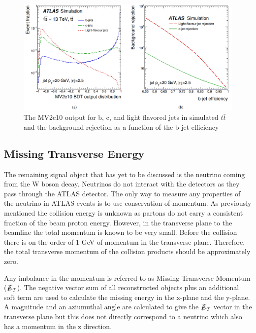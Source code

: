 \begin{figure}[h!]
	\centering
	\includegraphics[width=\columnwidth]{../ThesisImages/Simulation/BTagMV2c10andRejVsEff.png}
	\caption[The MV2c10 output for b, c, and light flavored jets in simulated $t\bar{t}$ and the background rejection as a function of the b-jet efficiency]{The MV2c10 output for b, c, and light flavored jets in simulated $t\bar{t}$ and the background rejection as a function of the b-jet efficiency \cite{BJetMVA}
	}
	\label{fig:BTag}
\end{figure}


\label{sec:bjetReco}

\subsection{Missing Transverse Energy}
The remaining signal object that has yet to be discussed is the neutrino coming from the W boson decay.  Neutrinos do not interact with the detectors as they pass through the ATLAS detector.  The only way to measure any properties of the neutrino in ATLAS events is to use conservation of momentum.  As previously mentioned the collision energy is unknown as partons do not carry a consistent fraction of the beam proton energy.  However, in the transverse plane to the beamline the total momentum is known to be very small.  Before the collision there is on the order of 1 GeV of momentum in the transverse plane.  Therefore, the total transverse momentum of the collision products should be approximately zero.

Any imbalance in the momentum is referred to as Missing Transverse Momentum ($\slashed{E}_T$).  The negative vector sum of all reconstructed objects plus an additional soft term are used to calculate the missing energy in the x-plane and the y-plane\cite{METreco}.  A magnitude and an aziumuthal angle are calculated to give the \textbf{$\slashed{E}_T$} vector in the transverse plane but this does not directly correspond to a neutrino which also has a momentum in the z direction.


